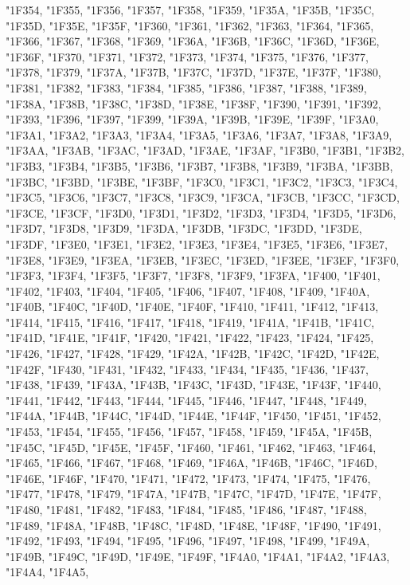 {"1F354,
"1F355,
"1F356,
"1F357,
"1F358,
"1F359,
"1F35A,
"1F35B,
"1F35C,
"1F35D,
"1F35E,
"1F35F,
"1F360,
"1F361,
"1F362,
"1F363,
"1F364,
"1F365,
"1F366,
"1F367,
"1F368,
"1F369,
"1F36A,
"1F36B,
"1F36C,
"1F36D,
"1F36E,
"1F36F,
"1F370,
"1F371,
"1F372,
"1F373,
"1F374,
"1F375,
"1F376,
"1F377,
"1F378,
"1F379,
"1F37A,
"1F37B,
"1F37C,
"1F37D,
"1F37E,
"1F37F,
"1F380,
"1F381,
"1F382,
"1F383,
"1F384,
"1F385,
"1F386,
"1F387,
"1F388,
"1F389,
"1F38A,
"1F38B,
"1F38C,
"1F38D,
"1F38E,
"1F38F,
"1F390,
"1F391,
"1F392,
"1F393,
"1F396,
"1F397,
"1F399,
"1F39A,
"1F39B,
"1F39E,
"1F39F,
"1F3A0,
"1F3A1,
"1F3A2,
"1F3A3,
"1F3A4,
"1F3A5,
"1F3A6,
"1F3A7,
"1F3A8,
"1F3A9,
"1F3AA,
"1F3AB,
"1F3AC,
"1F3AD,
"1F3AE,
"1F3AF,
"1F3B0,
"1F3B1,
"1F3B2,
"1F3B3,
"1F3B4,
"1F3B5,
"1F3B6,
"1F3B7,
"1F3B8,
"1F3B9,
"1F3BA,
"1F3BB,
"1F3BC,
"1F3BD,
"1F3BE,
"1F3BF,
"1F3C0,
"1F3C1,
"1F3C2,
"1F3C3,
"1F3C4,
"1F3C5,
"1F3C6,
"1F3C7,
"1F3C8,
"1F3C9,
"1F3CA,
"1F3CB,
"1F3CC,
"1F3CD,
"1F3CE,
"1F3CF,
"1F3D0,
"1F3D1,
"1F3D2,
"1F3D3,
"1F3D4,
"1F3D5,
"1F3D6,
"1F3D7,
"1F3D8,
"1F3D9,
"1F3DA,
"1F3DB,
"1F3DC,
"1F3DD,
"1F3DE,
"1F3DF,
"1F3E0,
"1F3E1,
"1F3E2,
"1F3E3,
"1F3E4,
"1F3E5,
"1F3E6,
"1F3E7,
"1F3E8,
"1F3E9,
"1F3EA,
"1F3EB,
"1F3EC,
"1F3ED,
"1F3EE,
"1F3EF,
"1F3F0,
"1F3F3,
"1F3F4,
"1F3F5,
"1F3F7,
"1F3F8,
"1F3F9,
"1F3FA,
"1F400,
"1F401,
"1F402,
"1F403,
"1F404,
"1F405,
"1F406,
"1F407,
"1F408,
"1F409,
"1F40A,
"1F40B,
"1F40C,
"1F40D,
"1F40E,
"1F40F,
"1F410,
"1F411,
"1F412,
"1F413,
"1F414,
"1F415,
"1F416,
"1F417,
"1F418,
"1F419,
"1F41A,
"1F41B,
"1F41C,
"1F41D,
"1F41E,
"1F41F,
"1F420,
"1F421,
"1F422,
"1F423,
"1F424,
"1F425,
"1F426,
"1F427,
"1F428,
"1F429,
"1F42A,
"1F42B,
"1F42C,
"1F42D,
"1F42E,
"1F42F,
"1F430,
"1F431,
"1F432,
"1F433,
"1F434,
"1F435,
"1F436,
"1F437,
"1F438,
"1F439,
"1F43A,
"1F43B,
"1F43C,
"1F43D,
"1F43E,
"1F43F,
"1F440,
"1F441,
"1F442,
"1F443,
"1F444,
"1F445,
"1F446,
"1F447,
"1F448,
"1F449,
"1F44A,
"1F44B,
"1F44C,
"1F44D,
"1F44E,
"1F44F,
"1F450,
"1F451,
"1F452,
"1F453,
"1F454,
"1F455,
"1F456,
"1F457,
"1F458,
"1F459,
"1F45A,
"1F45B,
"1F45C,
"1F45D,
"1F45E,
"1F45F,
"1F460,
"1F461,
"1F462,
"1F463,
"1F464,
"1F465,
"1F466,
"1F467,
"1F468,
"1F469,
"1F46A,
"1F46B,
"1F46C,
"1F46D,
"1F46E,
"1F46F,
"1F470,
"1F471,
"1F472,
"1F473,
"1F474,
"1F475,
"1F476,
"1F477,
"1F478,
"1F479,
"1F47A,
"1F47B,
"1F47C,
"1F47D,
"1F47E,
"1F47F,
"1F480,
"1F481,
"1F482,
"1F483,
"1F484,
"1F485,
"1F486,
"1F487,
"1F488,
"1F489,
"1F48A,
"1F48B,
"1F48C,
"1F48D,
"1F48E,
"1F48F,
"1F490,
"1F491,
"1F492,
"1F493,
"1F494,
"1F495,
"1F496,
"1F497,
"1F498,
"1F499,
"1F49A,
"1F49B,
"1F49C,
"1F49D,
"1F49E,
"1F49F,
"1F4A0,
"1F4A1,
"1F4A2,
"1F4A3,
"1F4A4,
"1F4A5,
}
